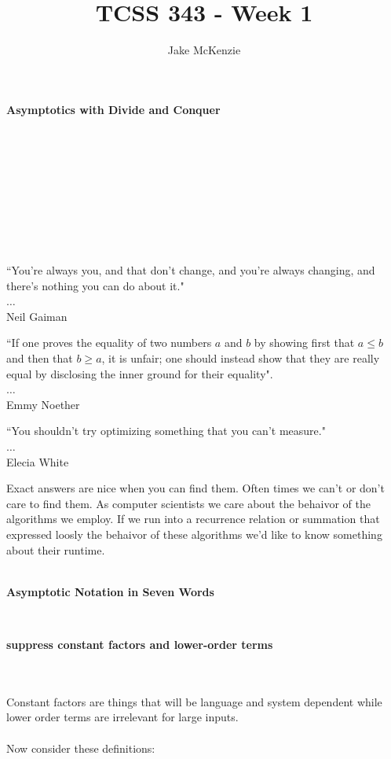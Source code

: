 \documentclass[12pt]{article}
\begin{document}
\title{TCSS 343 - Week 1}
\author{Jake McKenzie}
\maketitle
\noindent\centerline{\textbf{Asymptotics with Divide and Conquer}}\\\\\\\\\\\\\\\\
\begin{center}
    ``You're always you, and that don't change, and you're always changing, and there's nothing you can do about it." \\$\dots$\\ Neil Gaiman
\end{center}
\begin{center}
    ``If one proves the equality of two numbers $a$ and $b$ by showing first that $a \leq b$ and then that $b \geq a$, it is unfair; one should instead show that they are really equal by disclosing the inner ground for their equality". \\$\dots$\\Emmy Noether
\end{center}
\begin{center}
    ``You shouldn't try optimizing something that you can't measure." \\$\dots$\\ Elecia White
\end{center}
\newpage
Exact answers are nice when you can find them. Often times we can't or don't care to find them. As computer scientists we care about the behaivor of the algorithms we employ. If we run into a recurrence relation or summation that expressed loosly the behaivor of these algorithms we'd like to know something about their runtime.\\\\
\centerline{\textbf{Asymptotic Notation in Seven Words}}\\
\centerline{\textbf{suppress constant factors and lower-order terms}}\\\\
Constant factors are things that will be language and system dependent while lower order terms are irrelevant for large inputs.\\\\
Now consider these definitions:\\
\end{document}
